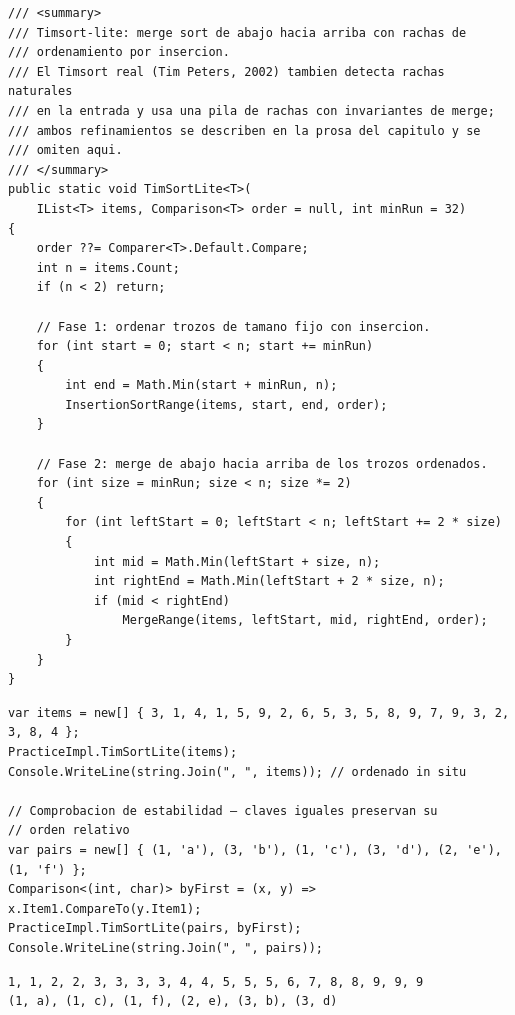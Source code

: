 \documentclass[11pt,a4paper]{article}
\begin{document}
\begin{lstlisting}[caption={Timsort-lite}]
/// <summary>
/// Timsort-lite: merge sort de abajo hacia arriba con rachas de
/// ordenamiento por insercion.
/// El Timsort real (Tim Peters, 2002) tambien detecta rachas naturales
/// en la entrada y usa una pila de rachas con invariantes de merge;
/// ambos refinamientos se describen en la prosa del capitulo y se
/// omiten aqui.
/// </summary>
public static void TimSortLite<T>(
    IList<T> items, Comparison<T> order = null, int minRun = 32)
{
    order ??= Comparer<T>.Default.Compare;
    int n = items.Count;
    if (n < 2) return;

    // Fase 1: ordenar trozos de tamano fijo con insercion.
    for (int start = 0; start < n; start += minRun)
    {
        int end = Math.Min(start + minRun, n);
        InsertionSortRange(items, start, end, order);
    }

    // Fase 2: merge de abajo hacia arriba de los trozos ordenados.
    for (int size = minRun; size < n; size *= 2)
    {
        for (int leftStart = 0; leftStart < n; leftStart += 2 * size)
        {
            int mid = Math.Min(leftStart + size, n);
            int rightEnd = Math.Min(leftStart + 2 * size, n);
            if (mid < rightEnd)
                MergeRange(items, leftStart, mid, rightEnd, order);
        }
    }
}
\end{lstlisting}

\begin{lstlisting}
var items = new[] { 3, 1, 4, 1, 5, 9, 2, 6, 5, 3, 5, 8, 9, 7, 9, 3, 2, 3, 8, 4 };
PracticeImpl.TimSortLite(items);
Console.WriteLine(string.Join(", ", items)); // ordenado in situ

// Comprobacion de estabilidad — claves iguales preservan su
// orden relativo
var pairs = new[] { (1, 'a'), (3, 'b'), (1, 'c'), (3, 'd'), (2, 'e'), (1, 'f') };
Comparison<(int, char)> byFirst = (x, y) => x.Item1.CompareTo(y.Item1);
PracticeImpl.TimSortLite(pairs, byFirst);
Console.WriteLine(string.Join(", ", pairs));
\end{lstlisting}

\begin{verbatim}
1, 1, 2, 2, 3, 3, 3, 3, 4, 4, 5, 5, 5, 6, 7, 8, 8, 9, 9, 9
(1, a), (1, c), (1, f), (2, e), (3, b), (3, d)
\end{verbatim}
\end{document}
